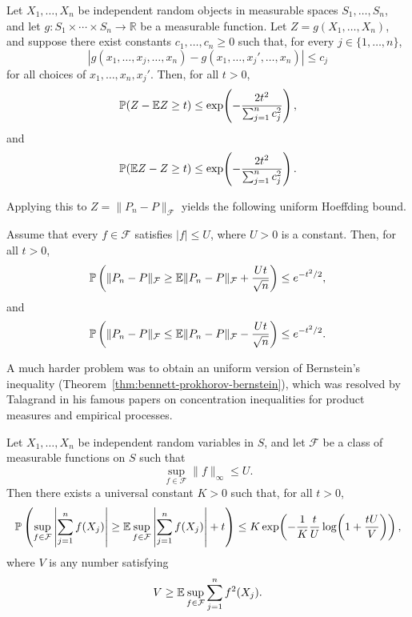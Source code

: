 \begin{theorem}\label{thm:bounded-difference}
  Let $X_1,\ldots,X_n$ be independent random objects in measurable spaces $S_1,\ldots,S_n$, and let $g:S_1\times\cdots\times S_n\to\mathbb R$ be a measurable function. Let $Z=g(X_1,\ldots,X_n)$, and suppose there exist constants $c_1,\ldots,c_n\ge 0$ such that, for every $j\in\{1,\ldots,n\}$,
  \[
    |g(x_1,\ldots,x_j,\ldots,x_n)-g(x_1,\ldots,x_j',\ldots,x_n)|\le c_j
  \]
  for all choices of $x_1,\ldots,x_n,x_j'$. Then, for all $t>0$,
  \[
    \mathbb{P}(Z-\mathbb{E} Z\ge t)\le \exp\!\left(-\frac{2t^2}{\sum_{j=1}^n c_j^2}\right),
  \]
  and
  \[
    \mathbb{P}(\mathbb{E} Z-Z\ge t)\le \exp\!\left(-\frac{2t^2}{\sum_{j=1}^n c_j^2}\right).
  \]
\end{theorem}

Applying this to $Z=\|P_n-P\|_{\mathcal F}$ yields the following uniform Hoeffding bound.

\begin{theorem}\label{thm:uniform-hoeffding}
  Assume that every $f\in\mathcal F$ satisfies $|f|\le U$, where $U>0$ is a constant. Then, for all $t>0$,
  \[
    \mathbb{P}\left(\|P_n-P\|_{\mathcal F}\ge \mathbb{E}\|P_n-P\|_{\mathcal F}+\frac{Ut}{\sqrt{n}}\right)
    \le e^{-t^2/2},
  \]
  and
  \[
    \mathbb{P}\left(\|P_n-P\|_{\mathcal F}\le \mathbb{E}\|P_n-P\|_{\mathcal F}-\frac{Ut}{\sqrt{n}}\right)
    \le e^{-t^2/2}.
  \]
\end{theorem}

A much harder problem was to obtain an uniform version of Bernstein's inequality (Theorem~\ref{thm:bennett-prokhorov-bernstein}), which was resolved by Talagrand in his famous papers \cite{talagrand1996new,talagrand1996new2} on concentration inequalities for product measures and empirical processes.

\begin{theorem}[Talagrand]\label{thm:talagrand}
  Let $X_1,\ldots,X_n$ be independent random variables in $S$, and let $\mathcal F$ be a class of measurable functions on $S$ such that
  \[
    \sup_{f\in\mathcal F}\|f\|_{\infty}\le U.
  \]
  Then there exists a universal constant $K>0$ such that, for all $t>0$,
  \[
    \mathbb{P}\left(
    \sup_{f\in\mathcal F}\left|\sum_{j=1}^n f(X_j)\right|
    \ge
    \mathbb{E}\sup_{f\in\mathcal F}\left|\sum_{j=1}^n f(X_j)\right|+t
    \right)
    \le
    K\exp\!\left(-\frac{1}{K}\frac{t}{U}\log\!\left(1+\frac{tU}{V}\right)\right),
  \]
  where $V$ is any number satisfying
  \[
    V\ge \mathbb{E}\sup_{f\in\mathcal F}\sum_{j=1}^n f^2(X_j).
  \]
\end{theorem}

